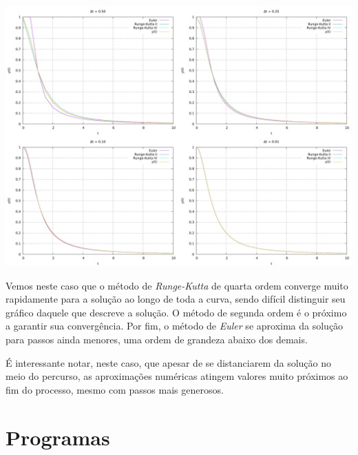 \documentclass{homework}
\begin{document}
	\begin{fig}
		\includegraphics[width=\textwidth]{../src/plot/L6-Q1.pdf}
	\end{fig}
	
	Vemos neste caso que o método de \textit{Runge-Kutta} de quarta ordem converge muito rapidamente para a solução ao longo de toda a curva, sendo difícil distinguir seu gráfico daquele que descreve a solução. O método de segunda ordem é o próximo a garantir sua convergência. Por fim, o método de \textit{Euler} se aproxima da solução para passos ainda menores, uma ordem de grandeza abaixo dos demais.\par
	
	É interessante notar, neste caso, que apesar de se distanciarem da solução no meio do percurso, as aproximações numéricas atingem valores muito próximos ao fim do processo, mesmo com passos mais generosos.
	
	\newpage
	
	\section*{Programas}
	
	\questx[{Escreva um programa que "integre" uma equação diferencial ordinária de segunda ordem $y''(t) = f(t, y(t), y'(t))$ onde o usuário pode escolher o método de solução entre as seguintes possibilidades:%
		\begin{enumerate}[label=\alph*)]%
			\item Aproximação de segunda ordem em Série de \textit{Taylor}
			\item \textit{Runge-Kutta-Nystrom}
		\end{enumerate}~
	}]%
\end{document}
